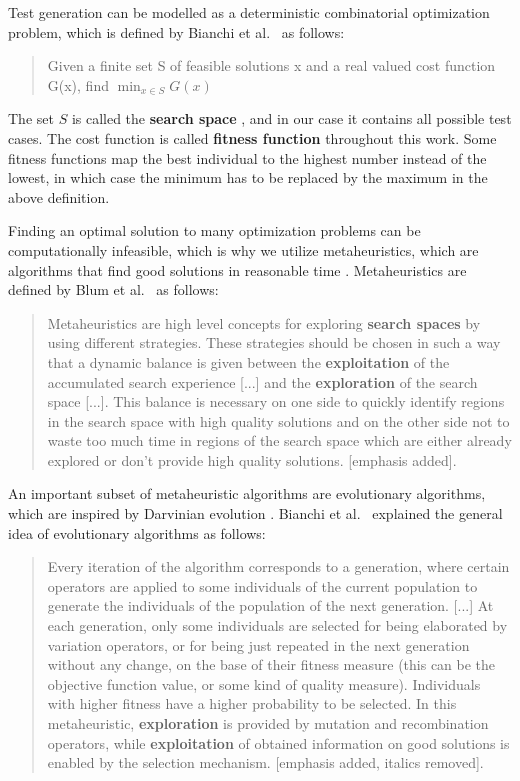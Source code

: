 \documentclass[
  a4paper,  %
  twoside,  %
  bibliography=totoc,
  headsepline,
  cleardoublepage=empty,
  parskip=half,
  draft=false
]{scrbook}
\begin{document}
Test generation can be modelled as a deterministic combinatorial optimization problem, which is defined by Bianchi et al.~\cite{bianchi2009survey} as follows:

\begin{quote}
	Given a finite set S of feasible solutions x and a real valued cost function G(x), find $\min_{x \in S} G(x)$
\end{quote}

The set $S$ is called the \textbf{search space} \cite{bianchi2009survey}, and in our case it contains all possible test cases.
The cost function is called \textbf{fitness function} throughout this work. Some fitness functions map the best individual to the highest number instead of the lowest, in which case the minimum has to be replaced by the maximum in the above definition.

Finding an optimal solution to many optimization problems can be computationally infeasible, which is why we utilize metaheuristics, which are algorithms that find good solutions in reasonable time \cite{bianchi2009survey}.
Metaheuristics are defined by Blum et al.~\cite{blum2003metaheuristics} as follows:
\begin{quote}
	Metaheuristics are high level concepts for exploring \textbf{search spaces} by using different
	strategies.
	These strategies should be chosen in such a way that a dynamic balance is
	given between the \textbf{exploitation} of the accumulated search experience [...] and the \textbf{exploration} of the search space [...].
	This balance is necessary on one side to quickly
	identify regions in the search space with high quality solutions and on the other side
	not to waste too much time in regions of the search space which are either already
	explored or don’t provide high quality solutions. [emphasis added].
\end{quote}

An important subset of metaheuristic algorithms are evolutionary algorithms, which are inspired by Darvinian evolution \cite{bianchi2009survey}. Bianchi et al.~\cite{bianchi2009survey} explained the general idea of evolutionary algorithms as follows:
\begin{quote}	
	Every iteration of the algorithm corresponds to a generation, where certain operators are applied to some individuals of the current population to generate the individuals of the population of the next generation. [...] At each generation, only some individuals are selected for being elaborated by variation operators, or for being just repeated in the next generation without any change, on the base of their fitness measure (this can be the objective function value, or some kind of quality measure). Individuals with higher fitness have a higher probability to be selected. In this metaheuristic, \textbf{exploration} is provided by mutation and recombination operators, while \textbf{exploitation} of obtained information on good solutions is enabled by the selection mechanism. [emphasis added, italics removed].
\end{quote}
\end{document}
